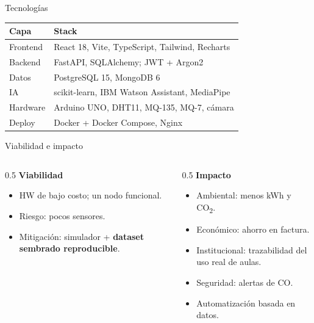 \documentclass[aspectratio=169,11pt]{beamer}
\begin{document}
\begin{frame}{Tecnologías}
  \small
  \begin{tabular}{@{}ll@{}}
    \toprule
    \textbf{Capa} & \textbf{Stack} \\
    \midrule
    Frontend & React 18, Vite, TypeScript, Tailwind, Recharts \\
    Backend  & FastAPI, SQLAlchemy; JWT + Argon2 \\
    Datos    & PostgreSQL 15, MongoDB 6 \\
    IA       & scikit-learn, IBM Watson Assistant, MediaPipe \\
    Hardware & Arduino UNO, DHT11, MQ-135, MQ-7, cámara \\
    Deploy   & Docker + Docker Compose, Nginx \\
    \bottomrule
  \end{tabular}
\end{frame}

\begin{frame}{Viabilidad e impacto}
  \begin{columns}[T]
    \begin{column}{0.5\textwidth}
      \textbf{Viabilidad}
      \begin{itemize}\small
        \item HW de bajo costo; un nodo funcional.
        \item Riesgo: pocos sensores.
        \item Mitigación: simulador + \textbf{dataset sembrado reproducible}.
      \end{itemize}
    \end{column}
    \begin{column}{0.5\textwidth}
      \textbf{Impacto}
      \begin{itemize}\small
        \item Ambiental: menos kWh y CO\textsubscript{2}.
        \item Económico: ahorro en factura.
        \item Institucional: trazabilidad del uso real de aulas.
        \item Seguridad: alertas de CO.
        \item Automatización basada en datos.
      \end{itemize}
    \end{column}
  \end{columns}
\end{frame}
\end{document}
